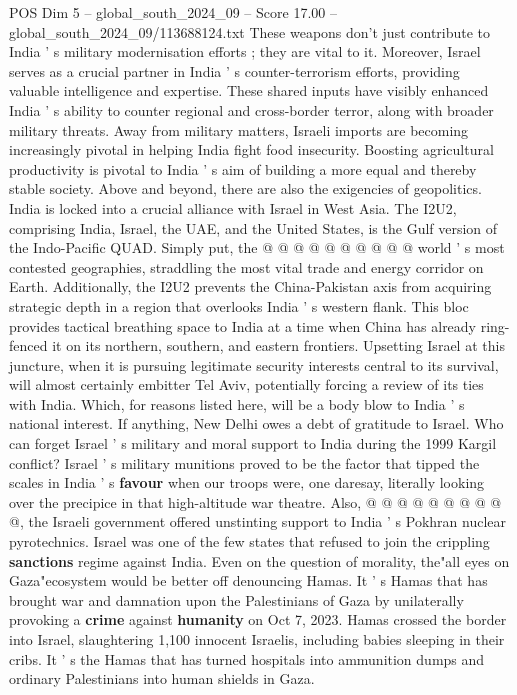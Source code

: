 \begin{textsample}{POS Dim 5 – global\_south\_2024\_09 – Score 17.00 – global\_south\_2024\_09/113688124.txt}
These weapons don't just contribute to India ' s military modernisation efforts ; they are vital to it.
Moreover, Israel serves as a crucial partner in India ' s counter-terrorism efforts, providing valuable intelligence and expertise.
These shared inputs have visibly enhanced India ' s ability to counter regional and cross-border terror, along with broader military threats.
Away from military matters, Israeli imports are becoming increasingly pivotal in helping India fight food insecurity.
Boosting agricultural productivity is pivotal to India ' s aim of building a more equal and thereby stable society.
Above and beyond, there are also the exigencies of geopolitics.
India is locked into a crucial alliance with Israel in West Asia.
The I2U2, comprising India, Israel, the UAE, and the United States, is the Gulf version of the Indo-Pacific QUAD.
Simply put, the @ @ @ @ @ @ @ @ @ @ world ' s most contested geographies, straddling the most vital trade and energy corridor on Earth.
Additionally, the I2U2 prevents the China-Pakistan axis from acquiring strategic depth in a region that overlooks India ' s western flank.
This bloc provides tactical breathing space to India at a time when China has already ring-fenced it on its northern, southern, and eastern frontiers.
Upsetting Israel at this juncture, when it is pursuing legitimate security interests central to its survival, will almost certainly embitter Tel Aviv, potentially forcing a review of its ties with India.
Which, for reasons listed here, will be a body blow to India ' s national interest.
If anything, New Delhi owes a debt of gratitude to Israel.
Who can forget Israel ' s military and moral support to India during the 1999 Kargil conflict?
Israel ' s military munitions proved to be the factor that tipped the scales in India ' s \textbf{favour} when our troops were, one daresay, literally looking over the precipice in that high-altitude war theatre.
Also, @ @ @ @ @ @ @ @ @ @, the Israeli government offered unstinting support to India ' s Pokhran nuclear pyrotechnics.
Israel was one of the few states that refused to join the crippling \textbf{sanctions} regime against India.
Even on the question of morality, the"all eyes on Gaza"ecosystem would be better off denouncing Hamas.
It ' s Hamas that has brought war and damnation upon the Palestinians of Gaza by unilaterally provoking a \textbf{crime} against \textbf{humanity} on Oct 7, 2023.
Hamas crossed the border into Israel, slaughtering 1,100 innocent Israelis, including babies sleeping in their cribs.
It ' s the Hamas that has turned hospitals into ammunition dumps and ordinary Palestinians into human shields in Gaza.

\end{textsample}
